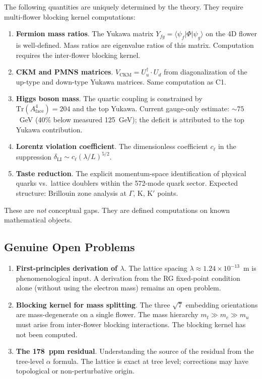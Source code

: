 \documentclass[12pt,a4paper]{article}
\theoremstyle{plain}
\theoremstyle{definition}
\begin{document}
The following quantities are uniquely determined by the theory. They require multi-flower blocking kernel computations:
\begin{enumerate}[label=\textbf{C\arabic*.}]
    \item \textbf{Fermion mass ratios}. The Yukawa matrix $Y_{fg} = \langle\psi_f|\Phi|\psi_g\rangle$ on the 4D flower is well-defined. Mass ratios are eigenvalue ratios of this matrix. Computation requires the inter-flower blocking kernel.
    
    \item \textbf{CKM and PMNS matrices}. $V_{\mathrm{CKM}} = U_u^\dagger \cdot U_d$ from diagonalization of the up-type and down-type Yukawa matrices. Same computation as C1.
    
    \item \textbf{Higgs boson mass}. The quartic coupling is constrained by $\mathrm{Tr}(A_{\mathrm{face}}^4) = 204$ and the top Yukawa. Current gauge-only estimate: $\sim 75$~GeV (40\% below measured 125~GeV); the deficit is attributed to the top Yukawa contribution.
    
    \item \textbf{Lorentz violation coefficient}. The dimensionless coefficient $c_\ell$ in the suppression $\delta_{\mathrm{LI}} \sim c_\ell(\lambda/L)^{5/2}$.
    
    \item \textbf{Taste reduction}. The explicit momentum-space identification of physical quarks vs.\ lattice doublers within the 572-mode quark sector. Expected structure: Brillouin zone analysis at $\Gamma$, K, K$'$ points.
\end{enumerate}

These are \emph{not} conceptual gaps. They are defined computations on known mathematical objects.

\subsection{Genuine Open Problems}

\begin{enumerate}[label=\textbf{P\arabic*.}]
    \item \textbf{First-principles derivation of $\lambda$}. The lattice spacing $\lambda \approx 1.24 \times 10^{-13}$~m is phenomenological input. A derivation from the RG fixed-point condition alone (without using the electron mass) remains an open problem.
    
    \item \textbf{Blocking kernel for mass splitting}. The three $\sqrt{7}$ embedding orientations are mass-degenerate on a single flower. The mass hierarchy $m_t \gg m_c \gg m_u$ must arise from inter-flower blocking interactions. The blocking kernel has not been computed.
    
    \item \textbf{The 178~ppm residual}. Understanding the source of the residual from the tree-level $\alpha$ formula. The lattice is exact at tree level; corrections may have topological or non-perturbative origin.
\end{enumerate}
\end{document}
